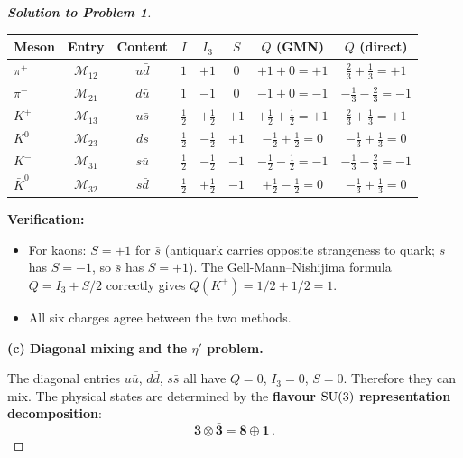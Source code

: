 \documentclass[11pt,a4paper]{article}
\begin{document}
\begin{proof}[\textbf{Solution to Problem 1}]
\renewcommand{\arraystretch}{1.3}
\begin{center}
\begin{tabular}{l c c c c c c c}
\toprule
\textbf{Meson} & \textbf{Entry} & \textbf{Content}
  & $I$ & $I_3$ & $S$ & $Q$ (GMN) & $Q$ (direct) \\
\midrule
$\pi^+$ & $\mathcal{M}_{12}$ & $u\bar{d}$
  & $1$ & $+1$ & $0$ & $+1 + 0 = +1$ & $\tfrac{2}{3} + \tfrac{1}{3} = +1$ \\
$\pi^-$ & $\mathcal{M}_{21}$ & $d\bar{u}$
  & $1$ & $-1$ & $0$ & $-1 + 0 = -1$ & $-\tfrac{1}{3} - \tfrac{2}{3} = -1$ \\
$K^+$ & $\mathcal{M}_{13}$ & $u\bar{s}$
  & $\tfrac{1}{2}$ & $+\tfrac{1}{2}$ & $+1$
  & $+\tfrac{1}{2} + \tfrac{1}{2} = +1$
  & $\tfrac{2}{3} + \tfrac{1}{3} = +1$ \\
$K^0$ & $\mathcal{M}_{23}$ & $d\bar{s}$
  & $\tfrac{1}{2}$ & $-\tfrac{1}{2}$ & $+1$
  & $-\tfrac{1}{2} + \tfrac{1}{2} = 0$
  & $-\tfrac{1}{3} + \tfrac{1}{3} = 0$ \\
$K^-$ & $\mathcal{M}_{31}$ & $s\bar{u}$
  & $\tfrac{1}{2}$ & $-\tfrac{1}{2}$ & $-1$
  & $-\tfrac{1}{2} - \tfrac{1}{2} = -1$
  & $-\tfrac{1}{3} - \tfrac{2}{3} = -1$ \\
$\bar{K}^0$ & $\mathcal{M}_{32}$ & $s\bar{d}$
  & $\tfrac{1}{2}$ & $+\tfrac{1}{2}$ & $-1$
  & $+\tfrac{1}{2} - \tfrac{1}{2} = 0$
  & $-\tfrac{1}{3} + \tfrac{1}{3} = 0$ \\
\bottomrule
\end{tabular}
\end{center}

\textbf{Verification:}
\begin{itemize}
  \item For kaons: $S = +1$ for $\bar{s}$ (antiquark carries
    opposite strangeness to quark; $s$ has $S = -1$, so
    $\bar{s}$ has $S = +1$).  The Gell-Mann--Nishijima formula
    $Q = I_3 + S/2$ correctly gives $Q(K^+) = 1/2 + 1/2 = 1$.
    \checkmark
  \item All six charges agree between the two methods.  \checkmark
\end{itemize}

\bigskip

\textbf{(c) Diagonal mixing and the $\eta'$ problem.}

The diagonal entries $u\bar{u}$, $d\bar{d}$, $s\bar{s}$ all have
$Q = 0$, $I_3 = 0$, $S = 0$.  Therefore they can mix.  The physical
states are determined by the \textbf{flavour $\mathrm{SU}(3)$ representation
decomposition}:
\[
  \mathbf{3} \otimes \bar{\mathbf{3}} = \mathbf{8} \oplus \mathbf{1}\,.
\]


\end{proof}
\end{document}
